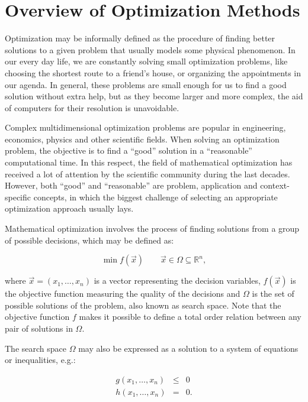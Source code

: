 
\chapter{Overview of Optimization Methods \label{chap:02-Optimization_models}}


\noindent Optimization may be informally defined as the procedure
of finding better solutions to a given problem that usually models
some physical phenomenon. In our every day life, we are constantly
solving small optimization problems, like choosing the shortest route
to a friend's house, or organizing the appointments in our agenda.
In general, these problems are small enough for us to find a good
solution without extra help, but as they become larger and more complex,
the aid of computers for their resolution is unavoidable.

Complex multidimensional optimization problems are popular in engineering,
economics, physics and other scientific fields. When solving an optimization
problem, the objective is to find a ``good'' solution in a ``reasonable''
computational time. In this respect, the field of mathematical optimization
has received a lot of attention by the scientific community during
the last decades. However, both ``good'' and ``reasonable'' are
problem, application and context-specific concepts, in which the biggest
challenge of selecting an appropriate optimization approach usually
lays.

Mathematical optimization involves the process of finding solutions
from a group of possible decisions, which may be defined as:

\begin{equation}
\min f(\vec{x})\qquad\vec{x}\in\Omega\subseteq\mathbb{R}^{n},
\end{equation}


\noindent where $\vec{x}=(x_{1},\dots,x_{n})$ is a vector representing
the decision variables, $f(\vec{x})$ is the objective function measuring
the quality of the decisions and $\Omega$ is the set of possible
solutions of the problem, also known as search space. Note that the
objective function $f$ makes it possible to define a total order
relation between any pair of solutions in $\Omega$.

The search space $\Omega$ may also be expressed as a solution to
a system of equations or inequalities, e.g.:

\begin{eqnarray}
g(x_{1},\dots,x_{n}) & \leq & 0\nonumber \\
h(x_{1},\dots,x_{n}) & = & 0.
\end{eqnarray}


